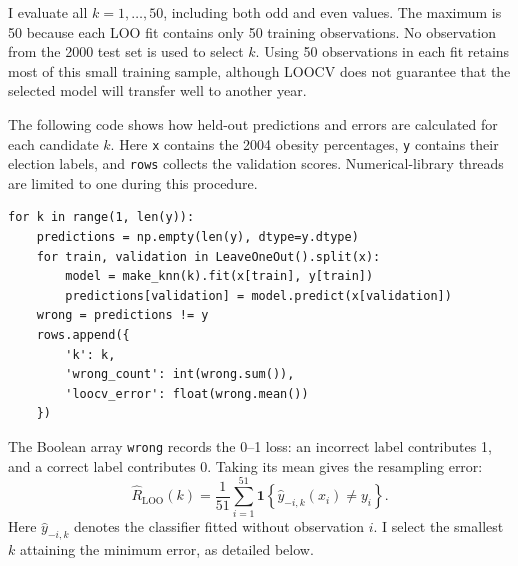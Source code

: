 \documentclass[11pt,a4paper]{article}
\begin{document}
I evaluate all $k=1,\ldots,50$, including both odd and even values. The maximum is 50 because each LOO fit contains only 50 training observations. No observation from the 2000 test set is used to select $k$. Using 50 observations in each fit retains most of this small training sample, although LOOCV does not guarantee that the selected model will transfer well to another year.

The following code shows how held-out predictions and errors are calculated for each candidate $k$. Here \texttt{x} contains the 2004 obesity percentages, \texttt{y} contains their election labels, and \texttt{rows} collects the validation scores. Numerical-library threads are limited to one during this procedure.
\par\addvspace{4pt}
\noindent\begin{minipage}{\linewidth}
\begin{lstlisting}[style=pythoncode,caption={LOOCV predictions and error calculation for each candidate k.}]
for k in range(1, len(y)):
    predictions = np.empty(len(y), dtype=y.dtype)
    for train, validation in LeaveOneOut().split(x):
        model = make_knn(k).fit(x[train], y[train])
        predictions[validation] = model.predict(x[validation])
    wrong = predictions != y
    rows.append({
        'k': k,
        'wrong_count': int(wrong.sum()),
        'loocv_error': float(wrong.mean())
    })
\end{lstlisting}
\end{minipage}\par\addvspace{4pt}

The Boolean array \texttt{wrong} records the 0--1 loss: an incorrect label contributes 1, and a correct label contributes 0. Taking its mean gives the resampling error:
\begin{equation}
\widehat R_{\mathrm{LOO}}(k)=\frac{1}{51}\sum_{i=1}^{51}
\mathbf 1\!\left\{\widehat y_{-i,k}(x_i)\ne y_i\right\}.
\end{equation}
Here $\widehat y_{-i,k}$ denotes the classifier fitted without observation $i$. I select the smallest $k$ attaining the minimum error, as detailed below.
\end{document}
